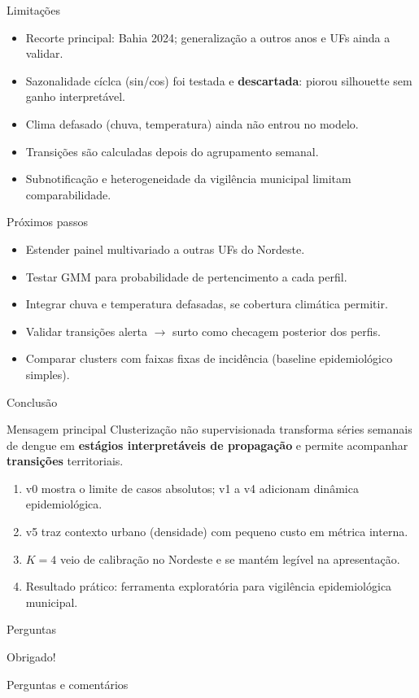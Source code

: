 \documentclass[aspectratio=169,xcolor=table]{beamer}
\begin{document}
\begin{frame}{Limita\c{c}\~oes}
    \begin{itemize}
        \item Recorte principal: Bahia 2024; generaliza\c{c}\~ao a outros anos e UFs ainda a validar.
        \item Sazonalidade c\'iclca (sin/cos) foi testada e \textbf{descartada}: piorou silhouette sem ganho interpret\'avel.
        \item Clima defasado (chuva, temperatura) ainda n\~ao entrou no modelo.
        \item Transi\c{c}\~oes s\~ao calculadas depois do agrupamento semanal.
        \item Subnotifica\c{c}\~ao e heterogeneidade da vigil\^encia municipal limitam comparabilidade.
    \end{itemize}
\end{frame}

\begin{frame}{Pr\'oximos passos}
    \begin{itemize}
        \item Estender painel multivariado a outras UFs do Nordeste.
        \item Testar GMM para probabilidade de pertencimento a cada perfil.
        \item Integrar chuva e temperatura defasadas, se cobertura clim\'atica permitir.
        \item Validar transi\c{c}\~oes alerta $\rightarrow$ surto como checagem posterior dos perfis.
        \item Comparar clusters com faixas fixas de incid\^encia (baseline epidemiol\'ogico simples).
    \end{itemize}
\end{frame}

\begin{frame}{Conclus\~ao}
    \begin{block}{Mensagem principal}
        Clusteriza\c{c}\~ao n\~ao supervisionada transforma s\'eries semanais de dengue em \textbf{est\'agios interpret\'aveis de propaga\c{c}\~ao} e permite acompanhar \textbf{transi\c{c}\~oes} territoriais.
    \end{block}

    \begin{enumerate}
        \item v0 mostra o limite de casos absolutos; v1 a v4 adicionam din\^amica epidemiol\'ogica.
        \item v5 traz contexto urbano (densidade) com pequeno custo em m\'etrica interna.
        \item $K=4$ veio de calibra\c{c}\~ao no Nordeste e se mant\'em leg\'ivel na apresenta\c{c}\~ao.
        \item Resultado pr\'atico: ferramenta explorat\'oria para vigil\^encia epidemiol\'ogica municipal.
    \end{enumerate}
\end{frame}

\begin{frame}{Perguntas}
    \begin{center}
        \Huge Obrigado!

        \vspace{0.8em}
        \large Perguntas e coment\'arios
    \end{center}
\end{frame}
\end{document}
